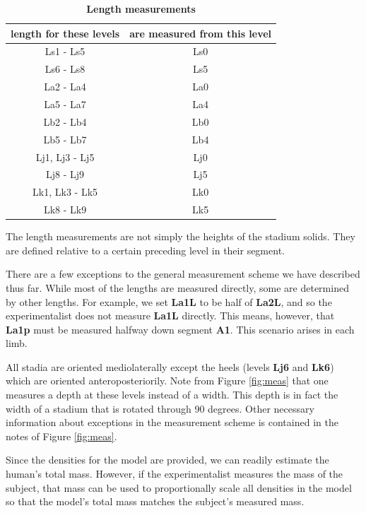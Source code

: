 \documentclass[10pt,a4paper,twocolumn]{article}
\begin{document}
\begin{table}
  \centering
  \caption{
    \bf{Length measurements}
  }
  \begin{tabular}{cc}
    \hline
    \textbf{length for these levels} & \textbf{are measured from this level}\\
    \hline
    Ls1 - Ls5 & Ls0 \\
    Ls6 - Ls8 & Ls5 \\
    La2 - La4 & La0 \\
    La5 - La7 & La4 \\
    Lb2 - Lb4 & Lb0 \\
    Lb5 - Lb7 & Lb4 \\
    Lj1, Lj3 - Lj5 & Lj0 \\
    Lj8 - Lj9 & Lj5  \\
    Lk1, Lk3 - Lk5 & Lk0 \\
    Lk8 - Lk9 & Lk5  \\
  \end{tabular}
  \begin{flushleft}
    The length measurements are not simply the heights of the stadium solids.
    They are defined relative to a certain preceding level in their segment.
  \end{flushleft}
  \label{tab:length}
\end{table}

There are a few exceptions to the general measurement scheme we have described
thus far. While most of the lengths are  measured directly, some are determined by
other lengths. For example, we set \textbf{La1L} to be half of \textbf{La2L},
and so the experimentalist does not measure \textbf{La1L} directly. This means, however,
that \textbf{La1p} must be measured halfway down segment \textbf{A1}. This
scenario arises in each limb.

All stadia are oriented mediolaterally except the heels (levels
\textbf{Lj6} and \textbf{Lk6}) which are oriented anteroposteriorily.
Note from Figure \ref{fig:meas} that one measures a depth at these levels
instead of a width. This depth is in fact the width of a stadium that is rotated
through 90 degrees. Other necessary information about exceptions in the
measurement scheme is contained in the notes of Figure \ref{fig:meas}.

Since the densities for the model are provided, we can readily estimate the human's total mass. However, if the experimentalist measures the mass of
the subject, that mass can be used to proportionally scale all densities in the model so that the model's total mass matches the subject's measured mass.
\end{document}
